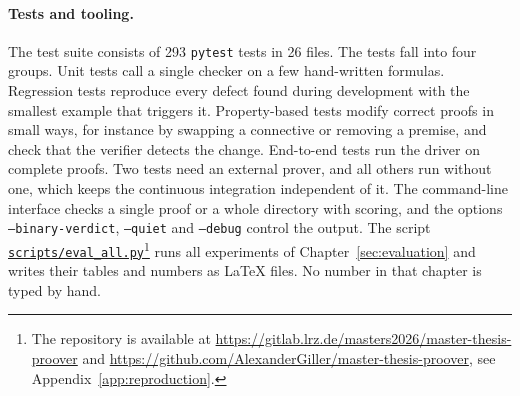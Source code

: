 \paragraph{Tests and tooling.}
\label{subsec:impl-testing}

The test suite consists of 293 \texttt{pytest} tests in 26 files.
The tests fall into four groups.
Unit tests call a single checker on a few hand-written formulas.
Regression tests reproduce every defect found during development with the smallest example that triggers it.
Property-based tests modify correct proofs in small ways, for instance by swapping a connective or removing a premise, and check that the verifier detects the change.
End-to-end tests run the driver on complete proofs.
Two tests need an external prover, and all others run without one, which keeps the continuous integration independent of it.
The command-line interface checks a single proof or a whole directory with scoring, and the options \texttt{--binary-verdict}, \texttt{--quiet} and \texttt{--debug} control the output.
The script \href{https://github.com/AlexanderGiller/master-thesis-proover/blob/main/scripts/eval_all.py}{\texttt{scripts/eval\_all.py}}\footnote{The repository is available at \url{https://gitlab.lrz.de/masters2026/master-thesis-proover} and \url{https://github.com/AlexanderGiller/master-thesis-proover}, see Appendix~\ref{app:reproduction}.} runs all experiments of Chapter~\ref{sec:evaluation} and writes their tables and numbers as \LaTeX{} files. No number in that chapter is typed by hand.

